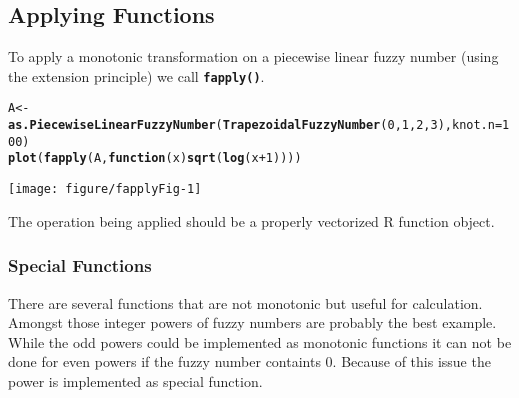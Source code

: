 \documentclass[11pt]{article}\usepackage[]{graphicx}\usepackage[]{color}
\makeatletter
\newcommand{\hlnum}[1]{\textcolor[rgb]{0.686,0.059,0.569}{#1}}%
\newcommand{\hlopt}[1]{\textcolor[rgb]{0,0,0}{#1}}%
\newcommand{\hlstd}[1]{\textcolor[rgb]{0.345,0.345,0.345}{#1}}%
\newcommand{\hlkwa}[1]{\textcolor[rgb]{0.161,0.373,0.58}{\textbf{#1}}}%
\newcommand{\hlkwb}[1]{\textcolor[rgb]{0.69,0.353,0.396}{#1}}%
\newcommand{\hlkwc}[1]{\textcolor[rgb]{0.333,0.667,0.333}{#1}}%
\newcommand{\hlkwd}[1]{\textcolor[rgb]{0.737,0.353,0.396}{\textbf{#1}}}%
\newenvironment{kframe}{%
 \def\at@end@of@kframe{}%
 \ifinner\ifhmode%
  \def\at@end@of@kframe{\end{minipage}}%
  \begin{minipage}{\columnwidth}%
 \fi\fi%
 \def\FrameCommand##1{\hskip\@totalleftmargin \hskip-\fboxsep
 \colorbox{shadecolor}{##1}\hskip-\fboxsep
     \hskip-\linewidth \hskip-\@totalleftmargin \hskip\columnwidth}%
 \MakeFramed {\advance\hsize-\width
   \@totalleftmargin\z@ \linewidth\hsize
   \@setminipage}}%
 {\par\unskip\endMakeFramed%
 \at@end@of@kframe}
\newenvironment{knitrout}{}{} %
\newcommand{\lang}[1]{\textsf{#1}\xspace}
\newcommand{\R}{\lang{R}}
\newcommand{\func}[1]{\texttt{\hlkwd{#1}}}
\makeatother
\begin{document}
\subsection{Applying Functions}


To apply a monotonic transformation on a piecewise linear fuzzy number
(using the extension principle) we call \func{fapply()}.

\begin{knitrout}\small
{}\color{fgcolor}\begin{kframe}
\begin{alltt}
\hlstd{A} \hlkwb{<-} \hlkwd{as.PiecewiseLinearFuzzyNumber}\hlstd{(}\hlkwd{TrapezoidalFuzzyNumber}\hlstd{(}\hlnum{0}\hlstd{,}\hlnum{1}\hlstd{,}\hlnum{2}\hlstd{,}\hlnum{3}\hlstd{),} \hlkwc{knot.n}\hlstd{=}\hlnum{100}\hlstd{)}
\hlkwd{plot}\hlstd{(}\hlkwd{fapply}\hlstd{(A,} \hlkwa{function}\hlstd{(}\hlkwc{x}\hlstd{)} \hlkwd{sqrt}\hlstd{(}\hlkwd{log}\hlstd{(x}\hlopt{+}\hlnum{1}\hlstd{))))}
\end{alltt}
\end{kframe}
\end{knitrout}

\begin{center}
\begin{knitrout}\small
{}\color{fgcolor}

{\centering \texttt{[image: figure/fapplyFig-1]} 

}



\end{knitrout}
\end{center}

\noindent
The operation being applied should be a properly
vectorized \R function object.

\subsubsection{Special Functions}

There are several functions that are not monotonic but useful for
calculation. Amongst those integer powers of fuzzy numbers are 
probably the best example. While the odd powers could be implemented
as monotonic functions it can not be done for even powers if the 
fuzzy number containts 0. Because of this issue the power is 
implemented as special function.
\end{document}
